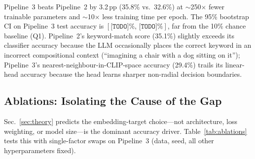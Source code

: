 \documentclass{article}
\begin{document}
Pipeline~3 beats Pipeline~2 by 3.2\,pp (35.8\% vs.\ 32.6\%) at $\sim$250$\times$ fewer trainable parameters and $\sim$10$\times$ less training time per epoch. The 95\% bootstrap CI on Pipeline~3 test accuracy is $[\texttt{[TODO]}\%,\,\texttt{[TODO]}\%]$, far from the 10\% chance baseline (Q1). Pipeline~2's keyword-match score (35.1\%) slightly exceeds its classifier accuracy because the LLM occasionally places the correct keyword in an incorrect compositional context (``imagining a chair with a dog sitting on it''); Pipeline~3's nearest-neighbour-in-CLIP-space accuracy (29.4\%) trails its linear-head accuracy because the head learns sharper non-radial decision boundaries.

\subsection{Ablations: Isolating the Cause of the Gap}
\label{sec:ablations}

Sec.~\ref{sec:theory} predicts the embedding-target choice---not architecture, loss weighting, or model size---is the dominant accuracy driver. Table~\ref{tab:ablations} tests this with single-factor swaps on Pipeline~3 (data, seed, all other hyperparameters fixed).
\end{document}
